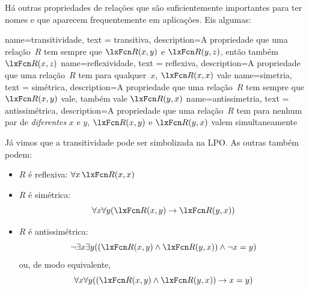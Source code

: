 Há outras propriedades de relações que são suficientemente importantes para ter nomes e que aparecem frequentemente em aplicações. Eis algumas:



{
  name=transitividade,
  text = transitiva,
  description={A propriedade que uma relação~$R$ tem \ifeff{} sempre que $\atom{R}{x,y}$ e $\atom{R}{y,z}$, então também $\atom{R}{x,z}$}
}
{
  name=reflexividade,
  text = reflexiva,
  description={A propriedade que uma relação~$R$ tem \ifeff{} para qualquer~$x$, $\atom{R}{x,x}$ vale}
}
{
  name=simetria,
  text = simétrica,
  description={A propriedade que uma relação~$R$ tem \ifeff{} sempre que $\atom{R}{x,y}$ vale, também vale $\atom{R}{y,x}$}
}
{
  name=antissimetria,
  text = antissimétrica,
  description={A propriedade que uma relação~$R$ tem \ifeff{} para nenhum par de
  \emph{diferentes} $x$ e $y$, $\atom{R}{x,y}$ e $\atom{R}{y,x}$
  valem simultaneamente}
}

Já vimos que a transitividade pode ser simbolizada na LPO. As outras também podem:

\begin{itemize}
\item $R$ é reflexiva: $\forall x\,\atom{R}{x,x}$
\item $R$ é simétrica: \[\forall x\forall y(\atom{R}{x,y} \eif \atom{R}{y,x})\]
\item $R$ é antissimétrica: \[\lnot\exists x\exists y((\atom{R}{x,y} \eand \atom{R}{y,x}) \eand \enot x=y)\] ou, de modo equivalente, \[\forall x\forall y((\atom{R}{x,y}
	\eand \atom{R}{y,x}) \eif x=y)\]
\end{itemize}

